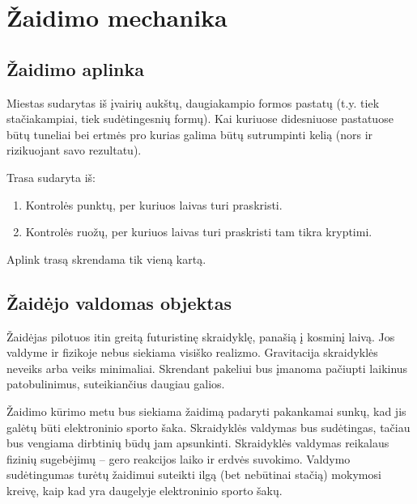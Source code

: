 \section{Žaidimo mechanika}
\subsection{Žaidimo aplinka}

Miestas sudarytas iš įvairių aukštų, daugiakampio formos pastatų (t.y. tiek stačiakampiai, tiek sudėtingesnių formų).
Kai kuriuose didesniuose pastatuose būtų tuneliai bei ertmės pro kurias galima būtų sutrumpinti kelią (nors ir rizikuojant savo rezultatu).

Trasa sudaryta iš:
\begin{enumerate}
\item Kontrolės punktų, per kuriuos laivas turi praskristi.
\item Kontrolės ruožų, per kuriuos laivas turi praskristi tam tikra kryptimi.
\end{enumerate}
Aplink trasą skrendama tik vieną kartą.

\subsection{Žaidėjo valdomas objektas}

Žaidėjas pilotuos itin greitą futuristinę skraidyklę, panašią į kosminį laivą.
Jos valdyme ir fizikoje nebus siekiama visiško realizmo.
Gravitacija skraidyklės neveiks arba veiks minimaliai.
Skrendant pakeliui bus įmanoma pačiupti laikinus patobulinimus, suteikiančius daugiau galios.

Žaidimo kūrimo metu bus siekiama žaidimą padaryti pakankamai sunkų, kad jis galėtų būti elektroninio sporto šaka.
Skraidyklės valdymas bus sudėtingas, tačiau bus vengiama dirbtinių būdų jam apsunkinti.
Skraidyklės valdymas reikalaus fizinių sugebėjimų -- gero reakcijos laiko ir erdvės suvokimo.
Valdymo sudėtingumas turėtų žaidimui suteikti ilgą (bet nebūtinai stačią) mokymosi kreivę, kaip kad yra daugelyje elektroninio sporto šakų.
